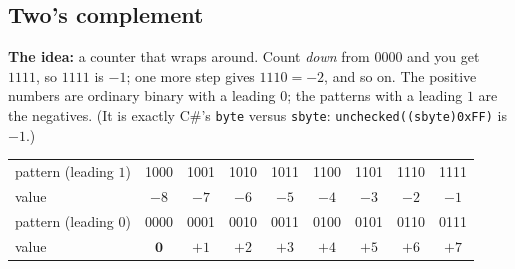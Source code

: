 \documentclass{fkt-notes}
\begin{document}
\subsection{Two's complement}
\textbf{The idea:} a counter that wraps around. Count \emph{down} from $0000$ and you get
$1111$, so $1111$ is $-1$; one more step gives $1110=-2$, and so on. The positive numbers
are ordinary binary with a leading $0$; the patterns with a leading $1$ are the negatives.
(It is exactly C\#'s \texttt{byte} versus \texttt{sbyte}: \texttt{unchecked((sbyte)0xFF)} is $-1$.)

\begin{center}
  \small
  \begin{tabular}{@{}l*{8}{c}@{}}
    \toprule
    pattern (leading $1$) & 1000 & 1001 & 1010 & 1011 & 1100 & 1101 & 1110 & 1111 \\
    value                 & $-8$ & $-7$ & $-6$ & $-5$ & $-4$ & $-3$ & $-2$ & $-1$ \\
    \midrule
    pattern (leading $0$) & 0000 & 0001 & 0010 & 0011 & 0100 & 0101 & 0110 & 0111 \\
    value                 & $\mathbf{0}$ & $+1$ & $+2$ & $+3$ & $+4$ & $+5$ & $+6$ & $+7$ \\
    \bottomrule
  \end{tabular}
\end{center}
\end{document}
